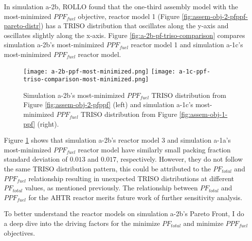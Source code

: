 In simulation a-2b, \gls{ROLLO} found that the one-third assembly model with the 
most-minimized $PPF_{fuel}$ objective, reactor model 1 (Figure 
\ref{fig:assem-obj-2-pfppf-pareto-distr}) has a TRISO distribution that oscillates
along the y-axis and oscillates slightly along the x-axis. 
Figure \ref{fig:a-2b-pf-triso-comparison} compares simulation a-2b's most-minimized 
$PPF_{fuel}$ reactor model 1 and simulation a-1c's most-minimized $PPF_{fuel}$ reactor 
model. 
\begin{figure}[htbp!]
    \centering
    \texttt{[image: a-2b-ppf-most-minimized.png]} 
    \texttt{[image: a-1c-ppf-triso-comparison-most-minimized.png]} 
    \caption{Simulation a-2b's most-minimized $PPF_{fuel}$ TRISO distribution 
    from Figure \ref{fig:assem-obj-2-pfppf} (left) and simulation a-1c's 
    most-minimized $PPF_{fuel}$ TRISO distribution from Figure 
    \ref{fig:assem-obj-1-ppf} (right).}
    \label{fig:a-2b-ppf-triso-comparison}
\end{figure}
Figure \ref{fig:a-2b-ppf-triso-comparison} shows that simulation a-2b's reactor model 3 
and simulation a-1a's most-minimized $PPF_{fuel}$ reactor model have similarly small 
packing fraction standard deviation of $0.013$ and $0.017$, respectively. 
However, they do not follow the same TRISO distribution pattern, this could be 
attributed to the $PF_{total}$ and $PPF_{fuel}$ relationship resulting in unexpected 
TRISO distributions at different $PF_{total}$ values, as mentioned previously. 
The relationship between $PF_{total}$ and $PPF_{fuel}$ for the \gls{AHTR} reactor 
merits future work of further sensitivity analysis. 

To better understand the reactor models on simulation a-2b's Pareto Front, I do a 
deep dive into the driving factors for the minimize $PF_{total}$ and minimize 
$PPF_{fuel}$ objectives. 

